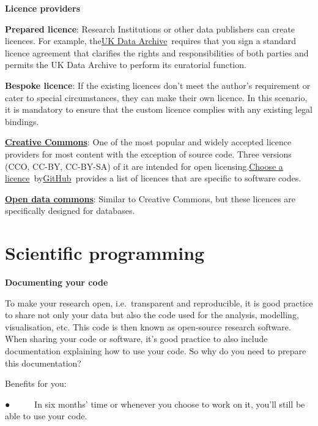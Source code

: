 \documentclass[
]{book}
\begin{document}
\textbf{Licence providers}

\textbf{Prepared licence}: Research Institutions or other data publishers can create licences. For example, the\href{https://www.data-archive.ac.uk/d/1QbEbEi0v_mnprVG2sfFdzJ-vYVqv4GijnIadOWkrbFE/edit}{}\href{https://www.data-archive.ac.uk/d/1QbEbEi0v_mnprVG2sfFdzJ-vYVqv4GijnIadOWkrbFE/edit}{UK Data Archive}~requires that you sign a standard licence agreement that clarifies the rights and responsibilities of both parties and permits the UK Data Archive to perform its curatorial function.

\textbf{Bespoke licence}: If the existing licences don't meet the author's requirement or cater to special circumstances, they can make their own licence. In this scenario, it is mandatory to ensure that the custom licence complies with any existing legal bindings.

\href{https://creativecommons.org/}{\textbf{Creative Commons}}: One of the most popular and widely accepted licence providers for most content with the exception of source code. Three versions (CCO, CC-BY, CC-BY-SA) of it are intended for open licensing.\href{https://choosealicense.com/licenses/}{}\href{https://choosealicense.com/licenses/}{Choose a licence}~by\href{https://github.com/}{GitHub}~provides a list of licences that are specific to software codes.

\href{https://opendatacommons.org/}{\textbf{Open data commons}}: Similar to Creative Commons, but these licences are specifically designed for databases.

\hypertarget{scientific-programming}{%
\section{Scientific programming}\label{scientific-programming}}

\textbf{Documenting your code}

To make your research open, i.e.~transparent and reproducible, it is good practice to share not only your data but also the code used for the analysis, modelling, visualisation, etc. This code is then known as open-source research software. When sharing your code or software, it's good practice to also include documentation explaining how to use your code. So why do you need to prepare this documentation?

Benefits for you:

● ~ ~ ~ In six months' time or whenever you choose to work on it, you'll still be able to use your code.
\end{document}

